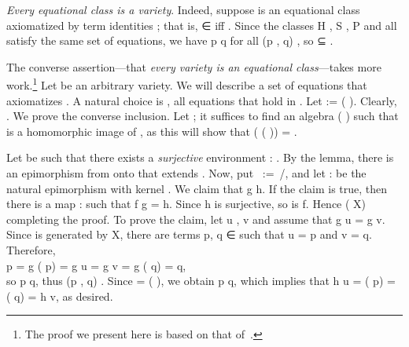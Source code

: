 \emph{Every equational class is a variety}. Indeed, suppose  is an equational
class axiomatized by term identities ; that is,  ∈  iff
  . Since the classes \af H , \af S , \af P  and
 all satisfy the same set of equations, we have    \ab p
 \ab q for all (\ab p , \ab q)  , so   ⊆ .

The converse assertion---that \emph{every variety is an equational class}---takes more
work.\footnote{The proof we present here is based on that of~\cite[Theorem 4.41]{Bergman:2012}.}
Let  be an arbitrary variety.  We will describe a set of equations that axiomatizes
.  A natural choice is  , all equations that hold in .
Let  :=  ( ). Clearly,   .  We prove the
converse inclusion. Let   ; it suffices to find an algebra  
 ( ) such that  is a homomorphic image of , as this will
show that    ( ( )) = .

Let  be such that there exists a \emph{surjective} environment
 :   .
By the  lemma, there is an epimorphism  from  onto 
that extends .
Now, put ~:=~/, and let  :   
be the natural epimorphism with kernel . We claim that  \ab g 
 \ab h. If the claim is true, then there is a map  :   
such that \ab f  \ab g = \ab h. Since \ab h is surjective, so is \ab f. Hence 
  ( \ab X)   completing the proof.
To prove the claim, let \ab u , \ab v   and assume that \ab g \ab u =
\ab g \ab v. Since  is generated by \ab X, there are terms \ab p, \ab q ∈
 such that \ab u =  \ab p and v =  \ab
q.
Therefore,\\[-4pt]

 \ab p = \ab g ( \ab p) = \ab g \ab u = \ab g \ab v =
\ab g ( \ab q) =  \ab q,\\[8pt]
so   \ab p  \ab q, thus (\ab p , \ab q)  
. Since    =
 ( ), we obtain   \ab p  \ab q, which implies
that \ab h \ab u = ( \ab p)   = ( \ab q)
  = \ab h \ab v, as desired.

